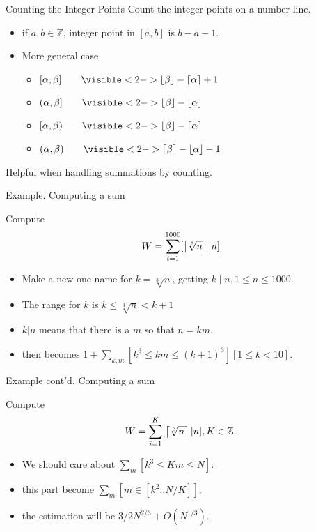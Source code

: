 \begin{frame}{Counting the Integer Points}
    Count the integer points on a number line. 
    \begin{itemize}
        \item if $a, b\in \mathbb Z$, integer point in $[a, b]$ is 
        $b-a+1$.
        \item More general case
        \begin{itemize}
            \item $[\alpha, \beta] \qquad \visible<2->{\flr{\beta}-\cil{\alpha}+1}$
            \item $(\alpha, \beta] \qquad \visible<2->{\flr{\beta}-\flr{\alpha}}$
            \item $[\alpha, \beta) \qquad \visible<2->{\flr{\beta}-\cil{\alpha}}$
            \item $(\alpha, \beta) \qquad \visible<2->{\cil{\beta}-\flr{\alpha}-1}$
        \end{itemize}
    \end{itemize}

    Helpful when handling summations by counting. 
\end{frame}

\begin{frame}{Example. Computing a sum}

\begin{example}
     Compute 
    $$
    W=\sum_{i=1}^{1000} [\left \lceil \sqrt[3]{n} \right\rceil | n]
    $$ 
\end{example}

\pause 

\begin{itemize}
    \item Make a new one name for $k=\sqrt[3]n$, getting $k\mid n, 1\leq n\leq 1000$. 
    \item The range for $k$ is $k\leq \sqrt[3]{n}<k+1$
    \item $k|n$ means that there is a $m$ so that $n=km$. 
    \item then becomes $1+\sum_{k,m} [k^3\leq km \leq (k+1)^3][1\leq k<10]$. 
\end{itemize}

\end{frame}
    
\begin{frame}{Example cont'd. Computing a sum}

\begin{example}
    Compute 
    $$
    W=\sum_{i=1}^{K} [\left \lceil \sqrt[3]{n} \right\rceil | n], K\in \mathbb Z. 
    $$ 
\end{example}


\pause 

\begin{itemize}
    \item We should care about $\sum_m[k^3\leq Km\leq N]$.
    \item this part become $\sum_m [m\in [k^2..N/K]]$. 
    \item the estimation will be $3/2N^{2/3}+O(N^{1/3})$. 
\end{itemize}
    
\end{frame}

